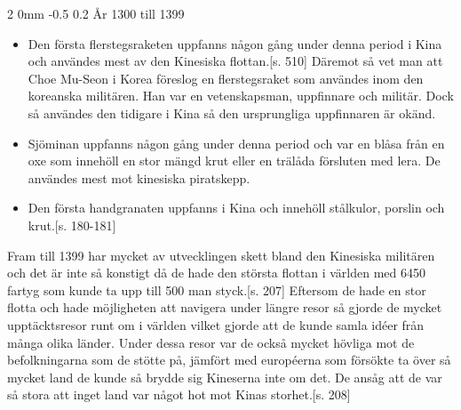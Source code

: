 \documentclass[a4paper,12pt]{article}
\makeatletter
\renewcommand{\subsection}{\@startsection
   {subsection}%
   {2}%
   {0mm}%
   {-0.5\baselineskip}%
   {0.2\baselineskip}%
   {\rmfamily\normalfont\slshape\normalsize}}%
\makeatother
\begin{document}
\subsection{År 1300 till 1399}
\begin{itemize}
\item Den första flerstegsraketen uppfanns någon gång under denna period i Kina och användes mest av den Kinesiska flottan.\cite{mina}[s. 510] Däremot så vet man att Choe Mu-Seon i Korea föreslog en flerstegsraket som användes inom den koreanska militären. Han var en vetenskapsman, uppfinnare och militär. Dock så användes den tidigare i Kina så den ursprungliga uppfinnaren är okänd.\cite{choe}

\item Sjöminan uppfanns någon gång under denna period och var en blåsa från en oxe som innehöll en stor mängd krut eller en trälåda försluten med lera. De användes mest mot kinesiska piratskepp.\cite{navalmine}

\item Den första handgranaten uppfanns i Kina och innehöll stålkulor, porslin och krut.\cite{mina}[s. 180-181]
\end{itemize}
Fram till 1399 har mycket av utvecklingen skett bland den Kinesiska militären och det är inte så konstigt då de hade den största flottan i världen med 6450 fartyg som kunde ta upp till 500 man styck.\cite{hansson}[s. 207] Eftersom de hade en stor flotta och hade möjligheten att navigera under längre resor så gjorde de mycket upptäcktsresor runt om i världen vilket gjorde att de kunde samla idéer från många olika länder. Under dessa resor var de också mycket hövliga mot de befolkningarna som de stötte på, jämfört med européerna som försökte ta över så mycket land de kunde så brydde sig Kineserna inte om det. De ansåg att de var så stora att inget land var något hot mot Kinas storhet.\cite{hansson}[s. 208]
\end{document}
